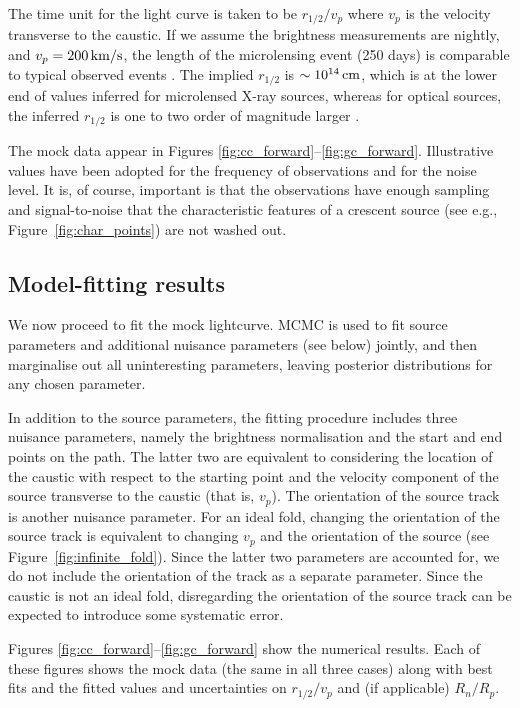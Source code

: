 \documentclass[usenatbib]{mn2e}
\begin{document}
The time unit for the light curve is taken to be $r_{1/2}/v_p$
where $v_p$ is the velocity transverse to the caustic.  If we
assume the brightness measurements are nightly, and
$v_p=\rm200\,km/s$, the length of the microlensing event (250
days) is comparable to typical observed events \cite[see
  e.g.,][]{2015ApJ...814L..26M}. The implied $r_{1/2}$ is
$\sim10^{14}\rm\,cm$, which is at the lower end of values inferred for
microlensed X-ray sources, whereas for optical sources, the inferred
$r_{1/2}$ is one to two order of magnitude larger \citep[see, e.g.,
  Figure~8 of][]{0004-637X-769-1-53}.  

The mock data appear in Figures
\ref{fig:cc_forward}--\ref{fig:gc_forward}.  Illustrative values have
been adopted for the frequency of observations and for the noise
level.  It is, of course, important is that the observations have
enough sampling and signal-to-noise that the characteristic features
of a crescent source (see e.g., Figure~\ref{fig:char_points}) are not
washed out.


\subsection{Model-fitting results}

We now proceed to fit the mock lightcurve.  MCMC is used to fit source
parameters and additional nuisance parameters (see below) jointly, and
then marginalise out all uninteresting parameters, leaving posterior
distributions for any chosen parameter.

In addition to the source parameters, the fitting procedure includes
three nuisance parameters, namely the brightness normalisation and the
start and end points on the path.  The latter two are equivalent to
considering the location of the caustic with respect to the starting
point and the velocity component of the source transverse to the
caustic (that is, $v_p$).  The orientation of the source track is
another nuisance parameter.  For an ideal fold, changing the
orientation of the source track is equivalent to changing $v_p$ and
the orientation of the source (see Figure~\ref{fig:infinite_fold}).
Since the latter two parameters are accounted for, we do not include
the orientation of the track as a separate parameter.  Since the
caustic is not an ideal fold, disregarding the orientation of the
source track can be expected to introduce some systematic error.

Figures \ref{fig:cc_forward}--\ref{fig:gc_forward} show the numerical
results.  Each of these figures shows the mock data (the same in all
three cases) along with best fits and the fitted values and
uncertainties on $r_{1/2}/v_p$ and (if applicable) $R_n/R_p$.
\end{document}
